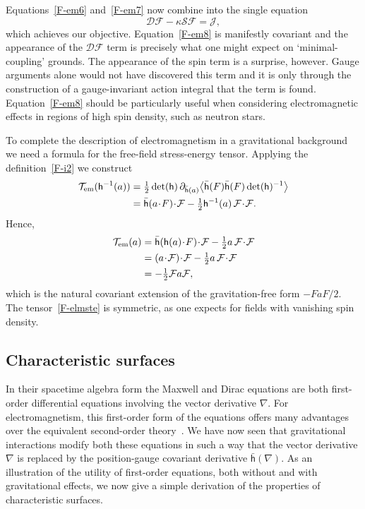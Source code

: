 \documentclass[a4paper]{article}
\numberwithin{equation}{section}
\newcommand{\nn}{\nonumber}
\newcommand{\dt}{\! \cdot \!}
\newcommand{\la}{\langle}
\newcommand{\ra}{\rangle}
\newcommand{\half}{{\textstyle \frac{1}{2}}}
\newcommand{\cld}{{\mathcal{D}}}
\newcommand{\clf}{{\mathcal{F}}}
\newcommand{\clj}{{\mathcal{J}}}
\newcommand{\cls}{{\mathcal{S}}}
\newcommand{\clt}{{\mathcal{T}}}
\newcommand{\lih}{\mathsf{h}}
\newcommand{\lbh}{\bar{\mathsf{h}}}
\newcommand{\ho}{\lbh}
\newcommand{\hu}{\lih}
\newcommand{\grad}{\nabla}
\newcommand{\dhi}{\det(\hu)^{-1}}
\renewcommand{\dh}{\det(\hu)}
\newcommand{\dhoa}{\partial_{\ho(a)}}
\begin{document}
%
Equations~\eqref{F-em6} and~\eqref{F-em7} now combine into the single equation
%
\begin{equation}
\cld \clf - \kappa \cls \clf = \clj,
\label{F-em8}
\end{equation}
%
which achieves our objective.  Equation~\eqref{F-em8} is manifestly
covariant and the appearance of the $\cld\clf$ term is precisely what
one might expect on `minimal-coupling' grounds.  The appearance of the
spin term is a surprise, however.  Gauge arguments alone would not
have discovered this term and it is only through the construction of a
gauge-invariant action integral that the term is found.
Equation~\eqref{F-em8} should be particularly useful when considering
electromagnetic effects in regions of high spin density, such as
neutron stars.  


To complete the description of electromagnetism in a gravitational
background we need a formula for the free-field stress-energy tensor.
Applying the definition~\eqref{F-i2} we construct 
%
\begin{align}
\clt_{\mbox{\scriptsize em}}( \hu^{-1}(a))
&= \half \dh \, \dhoa \bigl\la \ho(F) \ho(F) \dhi \bigr\ra \nn \\
&=\ho(a \dt F) \dt \clf - \half \hu^{-1}(a) \, \clf \dt \clf .
\end{align}
%
Hence,
%
\begin{align}
\clt_{\mbox{\scriptsize em}}(a) 
&= \ho(\hu(a) \dt F) \dt \clf - \half a \, \clf \dt \clf \nn \\
&= (a \dt \clf) \dt \clf - \half a \, \clf \dt \clf \nn \\
&= -\half \clf a \clf,
\label{F-elmste}
\end{align}
%
which is the natural covariant extension of the gravitation-free form
$-FaF/2$.  The tensor~\eqref{F-elmste} is symmetric, as one expects for
fields with vanishing spin density.  



\subsection{Characteristic surfaces}
\label{charac}

In their spacetime algebra form the Maxwell and Dirac equations are
both first-order differential equations involving the vector
derivative $\grad$.  For electromagnetism, this first-order form of
the equations offers many advantages over the equivalent second-order
theory~\cite{hes-sta,DGL93-paths}.  We have now seen that
gravitational interactions modify both these equations in such a way
that the vector derivative $\grad$ is replaced by the position-gauge
covariant derivative $\ho(\grad)$.  As an illustration of the utility
of first-order equations, both without and with gravitational effects,
we now give a simple derivation of the properties of characteristic
surfaces.
\end{document}
